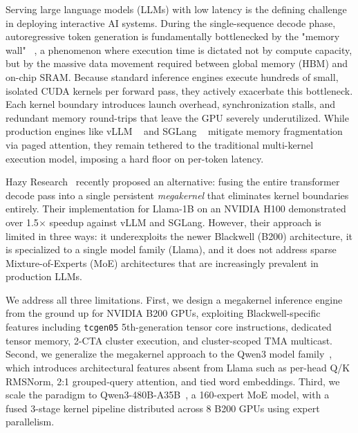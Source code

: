 \documentclass[sigplan,screen]{acmart}
\begin{document}
Serving large language models (LLMs) with low latency is the defining challenge in deploying interactive AI systems. During the single-sequence decode phase, autoregressive token generation is fundamentally bottlenecked by the "memory wall" ~\cite{zhao2024llminference}, a phenomenon where execution time is dictated not by compute capacity, but by the massive data movement required between global memory (HBM) and on-chip SRAM. Because standard inference engines execute hundreds of small, isolated CUDA kernels per forward pass, they actively exacerbate this bottleneck. Each kernel boundary introduces launch overhead, synchronization stalls, and redundant memory round-trips that leave the GPU severely underutilized. While production engines like vLLM ~\cite{vllm} and SGLang ~\cite{sglang} mitigate memory fragmentation via paged attention, they remain tethered to the traditional multi-kernel execution model, imposing a hard floor on per-token latency.

Hazy Research~\cite{hazyresearch} recently proposed an alternative: fusing the entire transformer decode pass into a single persistent \textit{megakernel} that eliminates kernel boundaries entirely. Their implementation for Llama-1B on an NVIDIA H100 demonstrated over 1.5$\times$ speedup against vLLM and SGLang. However, their approach is limited in three ways: it underexploits the newer Blackwell (B200) architecture, it is specialized to a single model family (Llama), and it does not address sparse Mixture-of-Experts (MoE) architectures that are increasingly prevalent in production LLMs.

We address all three limitations. First, we design a megakernel inference engine from the ground up for NVIDIA B200 GPUs, exploiting Blackwell-specific features including \texttt{tcgen05} 5th-generation tensor core instructions, dedicated tensor memory, 2-CTA cluster execution, and cluster-scoped TMA multicast. Second, we generalize the megakernel approach to the Qwen3 model family~\cite{qwen3}, which introduces architectural features absent from Llama such as per-head Q/K RMSNorm, 2:1 grouped-query attention, and tied word embeddings. Third, we scale the paradigm to Qwen3-480B-A35B~\cite{qwen3}, a 160-expert MoE model, with a fused 3-stage kernel pipeline distributed across 8 B200 GPUs using expert parallelism.
\end{document}
